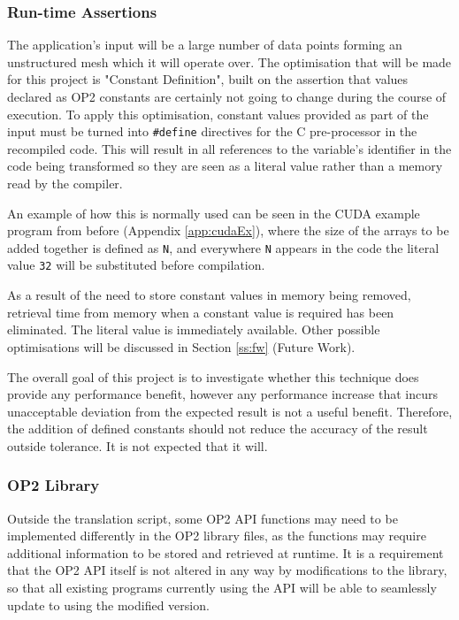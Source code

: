 \subsubsection{Run-time Assertions}
The application's input will be a large number of data points forming an unstructured mesh which it will operate over. The optimisation that will be made for this project is "Constant Definition", built on the assertion that values declared as OP2 constants are certainly not going to change during the course of execution. To apply this optimisation, constant values provided as part of the input must be turned into \verb|#define| directives for the C pre-processor in the recompiled code. This will result in all references to the variable's identifier in the code being transformed so they are seen as a literal value rather than a memory read by the compiler.
\par
An example of how this is normally used can be seen in the CUDA example program from before (Appendix \ref{app:cudaEx}), where the size of the arrays to be added together is defined as \verb|N|, and everywhere \verb|N| appears in the code the literal value \verb|32| will be substituted before compilation.
\par
As a result of the need to store constant values in memory being removed, retrieval time from memory when a constant value is required has been eliminated. The literal value is immediately available. Other possible optimisations will be discussed in Section \ref{ss:fw} (Future Work).
\par
The overall goal of this project is to investigate whether this technique does provide any performance benefit, however any performance increase that incurs unacceptable deviation from the expected result is not a useful benefit. Therefore, the addition of defined constants should not reduce the accuracy of the result outside tolerance. It is not expected that it will.


\subsubsection{OP2 Library}
Outside the translation script, some OP2 API functions may need to be implemented differently in the OP2 library files, as the functions may require additional information to be stored and retrieved at runtime. It is a requirement that the OP2 API itself is not altered in any way by modifications to the library, so that all existing programs currently using the API will be able to seamlessly update to using the modified version.

